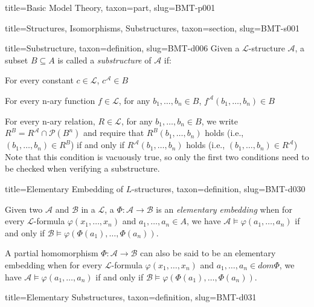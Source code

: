 \documentclass[a4paper]{article}
\begin{document}
\begin{tree}{title={Basic Model Theory}, taxon={part}, slug={BMT-p001}}
\begin{tree}{title={Structures, Isomorphisms, Substructures}, taxon={section}, slug={BMT-s001}}
\begin{tree}{title={Substructure}, taxon={definition}, slug={BMT-d006}}
Given a \(\mathcal {L}\)-structure \(\mathcal {A}\), a subset \(B  \subseteq  A\) is called a \emph{substructure} of \(\mathcal {A}\) if:\par{For every constant \(c \in   \mathcal {L}\), \(c^{ \mathcal {A}}  \in  B\)}\par{For every n-ary function \(f \in   \mathcal {L}\), for any \(b_1, \dots , b_n  \in  B\), \(f^{ \mathcal {A}}(b_1, \dots ,b_n)  \in  B\)}\par{For every n-ary relation, \(R \in   \mathcal {L}\), for any \(b_1, \dots , b_n  \in  B\), we write \(R^B = R^{ \mathcal {A}} \cap   \mathcal {P}(B^n)\) and require that
\(R^{B}(b_1, \dots , b_n)\) holds (i.e., \((b_1, \dots , b_n)  \in  R^{B}\))  if and only if \(R^{ \mathcal {A}}(b_1, \dots , b_n)\) holds (i.e., \((b_1, \dots , b_n)  \in  R^{ \mathcal {A}}\)) 
Note that this condition is vacuously true, so only the first two conditions need to be checked when verifying a substructure.}
\end{tree}

\begin{tree}{title={Elementary Embedding of \(L\)-structures}, taxon={definition}, slug={BMT-d030}}

    Given two  \(\mathcal {A}\) and \(\mathcal {B}\) in a  \(\mathcal {L}\),
    a  \(\Phi \colon \mathcal {A}  \to   \mathcal {B}\) is an \emph{elementary embedding} when
    for every \(\mathcal  L\)-formula \(\varphi (x_1, \dots ,x_n)\) and \(a_1, \dots ,a_n \in  A\),
    we have \(\mathcal  A \vDash \varphi (a_1, \dots ,a_n)\) if and only if \(\mathcal  B \vDash \varphi ( \Phi (a_1), \dots , \Phi (a_n))\).

    A partial homomorphism \(\Phi : \mathcal {A} \to \mathcal {B}\) can also be said to be an elementary embedding when
    for every \(\mathcal  L\)-formula \(\varphi (x_1, \dots ,x_n)\) and \(a_1, \dots ,a_n \in  dom \Phi\),
    we have \(\mathcal  A \vDash \varphi (a_1, \dots ,a_n)\) if and only if \(\mathcal  B \vDash \varphi ( \Phi (a_1), \dots , \Phi (a_n))\).



\end{tree}

\begin{tree}{title={Elementary Substructures}, taxon={definition}, slug={BMT-d031}}


\end{tree}
\end{tree}
\end{tree}
\end{document}

